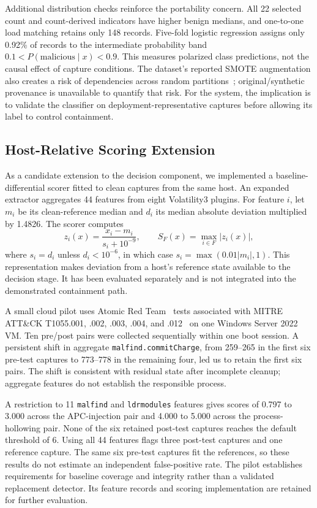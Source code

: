 \documentclass[conference]{IEEEtran}
\begin{document}
Additional distribution checks reinforce the portability concern. All 22
selected count and count-derived indicators have higher benign medians, and
one-to-one load matching retains only 148 records. Five-fold logistic
regression assigns only 0.92\% of records to the intermediate probability band
$0.1<P(\mathrm{malicious}\mid x)<0.9$. This measures polarized class
predictions, not the causal effect of capture conditions. The dataset's
reported SMOTE augmentation also creates a risk of dependencies across random
partitions~\cite{carrier2022}; original/synthetic provenance is unavailable
to quantify that risk. For the system, the implication is to validate the
classifier on deployment-representative captures before allowing its label to
control containment.

\subsection{Host-Relative Scoring Extension}
As a candidate extension to the decision component, we implemented a
baseline-differential scorer fitted to clean captures from the same host.
An expanded extractor aggregates 44 features from eight Volatility3 plugins.
For feature $i$, let $m_i$ be its clean-reference median and $d_i$ its median
absolute deviation multiplied by 1.4826. The scorer computes
\begin{equation}
z_i(x)=\frac{x_i-m_i}{s_i+10^{-9}},\qquad
S_F(x)=\max_{i\in F}|z_i(x)|,
\end{equation}
where $s_i=d_i$ unless $d_i<10^{-6}$, in which case
$s_i=\max(0.01|m_i|,1)$. This representation makes deviation from a host's
reference state available to the decision stage. It has been evaluated
separately and is not integrated into the demonstrated containment path.

A small cloud pilot uses Atomic Red Team~\cite{atomicredteam} tests associated
with MITRE ATT\&CK T1055.001, .002, .003, .004, and .012~\cite{mitre1055} on
one Windows Server 2022 VM. Ten pre/post pairs were collected sequentially
within one boot session. A persistent shift in aggregate
\texttt{malfind.commitCharge}, from 259--265 in the first six pre-test captures
to 773--778 in the remaining four, led us to retain the first six pairs.
The shift is consistent with residual state after incomplete cleanup;
aggregate features do not establish the responsible process.

A restriction to 11 \texttt{malfind} and \texttt{ldrmodules} features gives
scores of 0.797 to 3.000 across the APC-injection pair and 4.000 to 5.000
across the process-hollowing pair. None of the six retained post-test captures
reaches the default threshold of 6. Using all 44 features flags three
post-test captures and one reference capture. The same six pre-test captures
fit the references, so these results do not estimate an independent
false-positive rate. The pilot establishes requirements for baseline coverage
and integrity rather than a validated replacement detector. Its feature
records and scoring implementation are retained for further evaluation.
\end{document}
